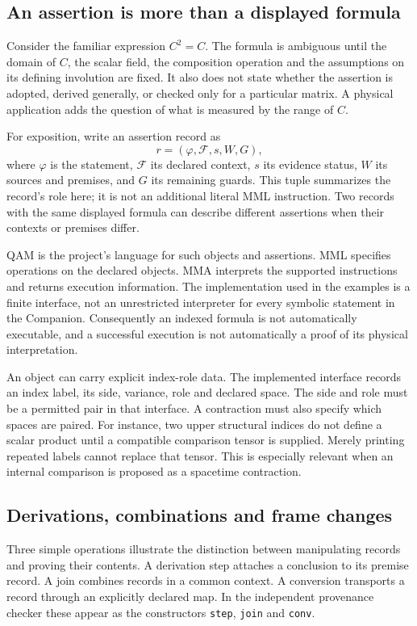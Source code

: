\subsection{An assertion is more than a displayed formula}
Consider the familiar expression $C^2=C$. The formula is ambiguous
until the domain of $C$, the scalar field, the composition operation
and the assumptions on its defining involution are fixed. It also
does not state whether the assertion is adopted, derived generally,
or checked only for a particular matrix. A physical application adds
the question of what is measured by the range of $C$.

For exposition, write an assertion record as
\begin{equation}
 r=(\varphi,\mathcal F,s,W,G),
\end{equation}
where $\varphi$ is the statement, $\mathcal F$ its declared context,
$s$ its evidence status, $W$ its sources and premises, and $G$ its
remaining guards. This tuple summarizes the record's role here; it
is not an additional literal MML instruction. Two records with the
same displayed formula can describe different assertions when their
contexts or premises differ.

QAM is the project's language for such objects and assertions. MML
specifies operations on the declared objects. MMA interprets the
supported instructions and returns execution information. The
implementation used in the examples is a finite interface, not an
unrestricted interpreter for every symbolic statement in the Companion.
Consequently an indexed formula is not automatically executable, and
a successful execution is not automatically a proof of its physical
interpretation.

An object can carry explicit index-role data. The implemented interface
records an index label, its side, variance, role and declared space.
The side and role must be a permitted pair in that interface. A
contraction must also specify which spaces are paired. For instance,
two upper structural indices do not define a scalar product until
a compatible comparison tensor is supplied. Merely printing repeated
labels cannot replace that tensor. This is especially relevant when
an internal comparison is proposed as a spacetime contraction.

\subsection{Derivations, combinations and frame changes}
Three simple operations illustrate the distinction between manipulating
records and proving their contents. A derivation step attaches a
conclusion to its premise record. A join combines records in a common
context. A conversion transports a record through an explicitly
declared map. In the independent provenance checker these appear as
the constructors \texttt{step}, \texttt{join} and \texttt{conv}.

